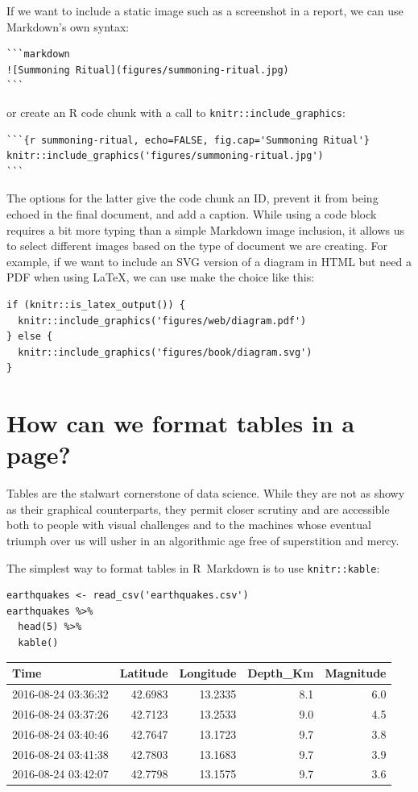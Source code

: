 If we want to include a static image such as a screenshot in a report,
we can use Markdown's own syntax:

\begin{lstlisting}
```markdown
![Summoning Ritual](figures/summoning-ritual.jpg)
```
\end{lstlisting}

or create an R code chunk with a call to \texttt{knitr::include\_graphics}:

\begin{lstlisting}
```{r summoning-ritual, echo=FALSE, fig.cap='Summoning Ritual'}
knitr::include_graphics('figures/summoning-ritual.jpg')
```
\end{lstlisting}

The options for the latter give the code chunk an ID,
prevent it from being echoed in the final document,
and add a caption.
While using a code block requires a bit more typing than a simple Markdown image inclusion,
it allows us to select different images based on the type of document we are creating.
For example,
if we want to include an SVG version of a diagram in HTML
but need a PDF when using LaTeX,
we can use make the choice like this:

\begin{lstlisting}
if (knitr::is_latex_output()) {
  knitr::include_graphics('figures/web/diagram.pdf')
} else {
  knitr::include_graphics('figures/book/diagram.svg')
}
\end{lstlisting}

\section{How can we format tables in a page?}

Tables are the stalwart cornerstone of data science.
While they are not as showy as their graphical counterparts,
they permit closer scrutiny
and are accessible both to people with visual challenges
and to the machines whose eventual triumph over us
will usher in an algorithmic age free of superstition and mercy.

The simplest way to format tables in R~Markdown is to use \texttt{knitr::kable}:

\begin{lstlisting}
earthquakes <- read_csv('earthquakes.csv')
earthquakes %>%
  head(5) %>%
  kable()
\end{lstlisting}

\begin{tabular}{l|r|r|r|r}
\hline
Time & Latitude & Longitude & Depth\_Km & Magnitude\\
\hline
2016-08-24 03:36:32 & 42.6983 & 13.2335 & 8.1 & 6.0\\
\hline
2016-08-24 03:37:26 & 42.7123 & 13.2533 & 9.0 & 4.5\\
\hline
2016-08-24 03:40:46 & 42.7647 & 13.1723 & 9.7 & 3.8\\
\hline
2016-08-24 03:41:38 & 42.7803 & 13.1683 & 9.7 & 3.9\\
\hline
2016-08-24 03:42:07 & 42.7798 & 13.1575 & 9.7 & 3.6\\
\hline
\end{tabular}

